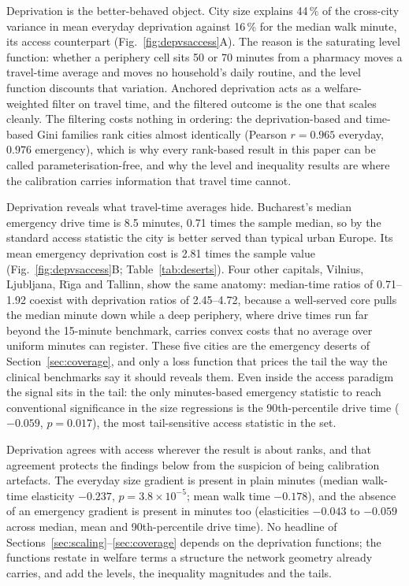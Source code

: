 \documentclass[11pt]{article}
\begin{document}
Deprivation is the better-behaved object. City size explains 44\,\% of the
cross-city variance in mean everyday deprivation against 16\,\% for the
median walk minute, its access counterpart (Fig.~\ref{fig:depvsaccess}A).
The reason is the saturating level function: whether a periphery cell sits
50 or 70 minutes from a pharmacy moves a travel-time average and moves no
household's daily routine, and the level function discounts that
variation. Anchored deprivation acts as a welfare-weighted filter on
travel time, and the filtered outcome is the one that scales cleanly. The
filtering costs nothing in ordering: the deprivation-based and time-based
Gini families rank cities almost identically (Pearson $r = 0.965$ everyday,
$0.976$ emergency), which is why every rank-based result in this paper can
be called parameterisation-free, and why the level and inequality results
are where the calibration carries information that travel time cannot.

Deprivation reveals what travel-time averages hide. Bucharest's median
emergency drive time is 8.5 minutes, 0.71 times the sample median, so by
the standard access statistic the city is better served than typical urban
Europe. Its mean emergency deprivation cost is 2.81 times the sample value
(Fig.~\ref{fig:depvsaccess}B; Table~\ref{tab:deserts}). Four other
capitals, Vilnius, Ljubljana, R\={\i}ga and Tallinn, show the same
anatomy: median-time ratios of 0.71--1.92 coexist with deprivation ratios
of 2.45--4.72, because a well-served core pulls the median minute down
while a deep periphery, where drive times run far beyond the 15-minute
benchmark, carries convex costs that no average over uniform minutes can
register. These five cities are the emergency deserts of
Section~\ref{sec:coverage}, and only a loss function that prices the tail
the way the clinical benchmarks say it should reveals them. Even inside the
access paradigm the signal sits in the tail: the only minutes-based
emergency statistic to reach conventional significance in the size
regressions is the 90th-percentile drive time ($-0.059$, $p = 0.017$), the
most tail-sensitive access statistic in the set.

Deprivation agrees with access wherever the result is about ranks, and
that agreement protects the findings below from the suspicion of being
calibration artefacts. The everyday size gradient is present in plain
minutes (median walk-time elasticity $-0.237$, $p = 3.8\times10^{-5}$;
mean walk time $-0.178$), and the absence of an emergency gradient is
present in minutes too (elasticities $-0.043$ to $-0.059$ across median,
mean and 90th-percentile drive time). No headline of
Sections~\ref{sec:scaling}--\ref{sec:coverage} depends on the
deprivation functions; the functions restate in welfare terms a structure
the network geometry already carries, and add the levels, the inequality
magnitudes and the tails.
\end{document}
